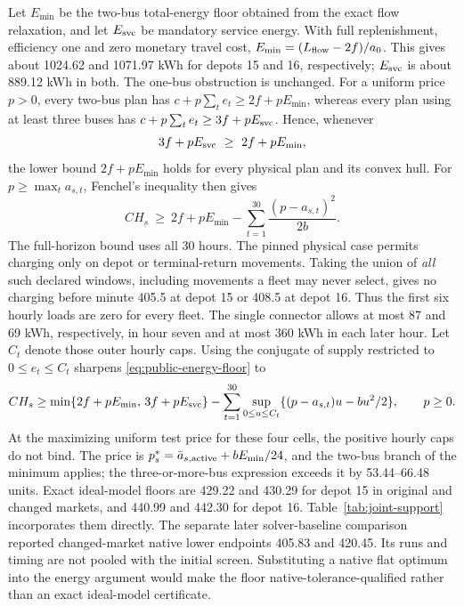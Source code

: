 Let $E_{\min}$ be the two-bus total-energy floor obtained from the exact flow
relaxation, and let $E_{\rm svc}$ be mandatory service energy. With full
replenishment, efficiency one and zero monetary travel cost,
$E_{\min}=(L_{\rm flow}-2f)/a_0$. This gives about 1024.62 and 1071.97 kWh
for depots 15 and 16, respectively; $E_{\rm svc}$ is about 889.12 kWh in
both. The one-bus obstruction is unchanged. For a uniform price $p>0$,
every two-bus plan has $c+p\sum_t e_t\geq2f+pE_{\min}$, whereas every
plan using at least three buses has
$c+p\sum_t e_t\geq3f+pE_{\rm svc}$. Hence, whenever
\begin{equation}\label{eq:public-cardinality-check}
3f+pE_{\rm svc}\ \geq\ 2f+pE_{\min},
\end{equation}
the lower bound $2f+pE_{\min}$ holds for every physical plan and its convex
hull. For $p\geq\max_t a_{s,t}$, Fenchel's inequality then gives
\begin{equation}\label{eq:public-energy-floor}
CH_s\ \geq\ 2f+pE_{\min}
       -\sum_{t=1}^{30}\frac{(p-a_{s,t})^2}{2b}.
\end{equation}
The full-horizon bound uses all 30 hours. The pinned physical case permits
charging only on depot or terminal-return movements. Taking the union of
\emph{all} such declared windows, including movements a fleet may never
select, gives no charging before minute 405.5 at depot 15 or 408.5 at depot
16. Thus the first six hourly loads are zero for every fleet. The single
connector allows at most 87 and 69 kWh, respectively, in hour seven and at
most 360 kWh in each later hour. Let $C_t$ denote those outer hourly caps.
Using the conjugate of supply restricted to $0\leq e_t\leq C_t$ sharpens
\eqref{eq:public-energy-floor} to
\begin{equation}\label{eq:public-availability-floor}
CH_s\geq\min\{2f+pE_{\min},\,3f+pE_{\rm svc}\}
-\sum_{t=1}^{30}\sup_{0\leq u\leq C_t}
\{(p-a_{s,t})u-bu^2/2\},\qquad p\geq0.
\end{equation}
At the maximizing uniform test price for these four cells, the positive
hourly caps do not bind. The price is
$p_s^*=\bar a_{s,\rm active}+bE_{\min}/24$, and the two-bus branch of the
minimum applies; the three-or-more-bus expression exceeds it by
53.44--66.48 units. Exact ideal-model floors are 429.22 and 430.29 for
depot 15 in original and changed markets, and 440.99 and 442.30 for depot
16. Table~\ref{tab:joint-support} incorporates them directly. The separate
later solver-baseline comparison reported changed-market native lower
endpoints 405.83 and 420.45. Its runs and timing are not pooled with the
initial screen. Substituting a native flat optimum into the energy argument
would make the floor native-tolerance-qualified rather than an exact
ideal-model certificate.

